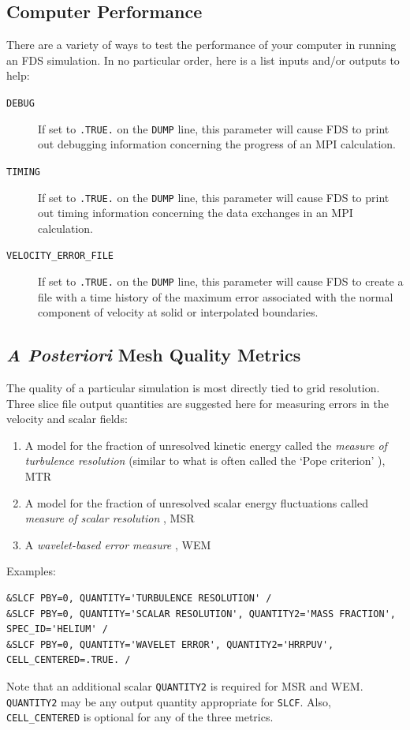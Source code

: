 \documentclass[11pt]{book}
\newcommand{\ct}{\tt\small}
\begin{document}
\subsection{Computer Performance}
\label{info:TIMING}

There are a variety of ways to test the performance of your computer in running an FDS simulation. In no particular order, here is a list inputs and/or outputs to help:
\begin{description}
\item[{\ct DEBUG}]  If set to {\ct .TRUE.} on the {\ct DUMP} line, this parameter will cause FDS to print out debugging information concerning the progress of an MPI
calculation.
\item[{\ct TIMING}] If set to {\ct .TRUE.} on the {\ct DUMP} line, this parameter will cause FDS to print out timing information concerning the data exchanges in an MPI
calculation.
\item[{\ct VELOCITY\_ERROR\_FILE}] If set to {\ct .TRUE.} on the {\ct DUMP} line, this parameter will cause FDS to create a file with a time history of the maximum error
associated with the normal component of velocity at solid or interpolated boundaries.
\end{description}


\subsection{\emph{A Posteriori} Mesh Quality Metrics}
\label{info:meshquality}
The quality of a particular simulation is most directly tied to grid resolution.  Three slice file output quantities are suggested here for measuring errors in the velocity and scalar fields:
\begin{enumerate}
\item A model for the fraction of unresolved kinetic energy called the \emph{measure of turbulence resolution} (similar to what is often called the `Pope criterion' \cite{Pope:2004}), MTR
\item A model for the fraction of unresolved scalar energy fluctuations called \emph{measure of scalar resolution} \cite{Vervisch:2010}, MSR
\item A \emph{wavelet-based error measure} \cite{McDermott:2010}, WEM
\end{enumerate}
Examples:

\footnotesize
\begin{verbatim}
&SLCF PBY=0, QUANTITY='TURBULENCE RESOLUTION' /
&SLCF PBY=0, QUANTITY='SCALAR RESOLUTION', QUANTITY2='MASS FRACTION', SPEC_ID='HELIUM' /
&SLCF PBY=0, QUANTITY='WAVELET ERROR', QUANTITY2='HRRPUV', CELL_CENTERED=.TRUE. /
\end{verbatim} \normalsize
Note that an additional scalar {\ct QUANTITY2} is required for MSR and WEM.  {\ct QUANTITY2} may be any output quantity appropriate for {\ct SLCF}.
Also, {\ct CELL\_CENTERED} is optional for any of the three metrics.
\end{document}
